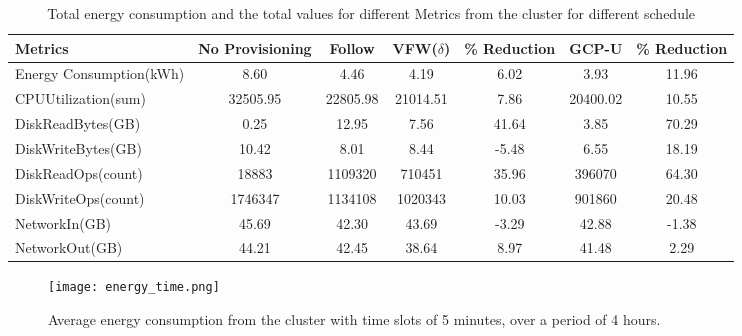 \documentclass[10pt,conference,compsocconf,letterpaper]{IEEEtran}
\begin{document}
\begin{table*}[!t]
  \centering
  \caption{Total energy consumption and the total values for different Metrics from the cluster for different schedule}
    \begin{tabular}{l|c|c|c|c|c|c}
    \hline\hline
    Metrics & No Provisioning & Follow  & VFW($\delta$) &  \% Reduction & GCP-U &  \% Reduction \\
    \hline
    Energy Consumption(kWh) &   8.60    &   4.46    &  4.19     &    6.02   & 3.93 & 11.96 \\
    CPUUtilization(sum) &   32505.95    &   22805.98    &  21014.51     &     7.86  & 20400.02& 10.55 \\
    DiskReadBytes(GB) &   0.25    &   12.95    &   7.56    &     41.64  & 3.85 & 70.29 \\
    DiskWriteBytes(GB) &  10.42     &   8.01    &   8.44    &    -5.48   & 6.55 & 18.19\\
    DiskReadOps(count) &  18883     &   1109320    &   710451    &    35.96 & 396070 & 64.30   \\
    DiskWriteOps(count) &  1746347     &   1134108    &   1020343    &    10.03 & 901860 &  20.48  \\
    NetworkIn(GB) &  45.69     &   42.30    &   43.69    &    -3.29  & 42.88 & -1.38 \\
    NetworkOut(GB) &  44.21     &  42.45     &   38.64    &    8.97  & 41.48 &  2.29\\
    \hline
    \end{tabular}\label{table:reduction}\end{table*}












\begin{figure}[!t]
\begin{center}
\texttt{[image: energy\_time.png]}
\caption{Average energy consumption from the cluster with time slots of 5 minutes, over a period of 4 hours.}
\label{fig:energyconsumption}
\end{center}
\end{figure}
\end{document}
